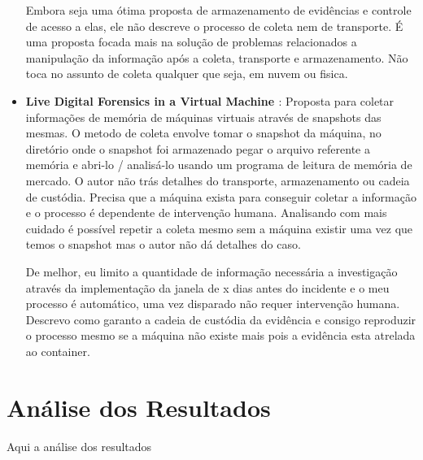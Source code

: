 \documentclass[
	12pt,				%
	openright,			%
	oneside,			%
	a4paper,			%
	english,			%
	french,				%
	spanish,			%
	brazil,				%
	]{abntex2}
\begin{document}
\begin{itemize}
Embora seja uma ótima proposta de armazenamento de evidências e controle de acesso a elas, ele não descreve o processo de coleta nem de transporte. É uma proposta focada mais na 
solução de problemas relacionados a manipulação da informação após a coleta, transporte e armazenamento. Não toca no assunto de coleta qualquer que seja, em nuvem ou fisica.\\

\item \textbf{Live Digital Forensics in a Virtual Machine \cite{Zhang2010} }: Proposta para coletar informações de memória de máquinas virtuais através de snapshots das mesmas.
O metodo de coleta envolve tomar o snapshot da máquina, no diretório onde o snapshot foi armazenado pegar o arquivo referente a memória e abri-lo / analisá-lo usando um programa de
leitura de memória de mercado. O autor não trás detalhes do transporte, armazenamento ou cadeia de custódia. Precisa que a máquina exista para conseguir coletar a informação e 
o processo é dependente de intervenção humana. Analisando com mais cuidado é possível repetir a coleta mesmo sem a máquina existir uma vez que temos o snapshot mas o autor não
dá detalhes do caso.

De melhor, eu limito a quantidade de informação necessária a investigação através da implementação da janela de x dias antes do incidente e o meu processo é automático, uma vez
disparado não requer intervenção humana. Descrevo como garanto a cadeia de custódia da evidência e consigo reproduzir o processo mesmo se a máquina não existe mais pois a evidência
esta atrelada ao container.


 \end{itemize}
 
\chapter{Análise dos Resultados}

Aqui a análise dos resultados


\postextual





\printindex
\end{document}
